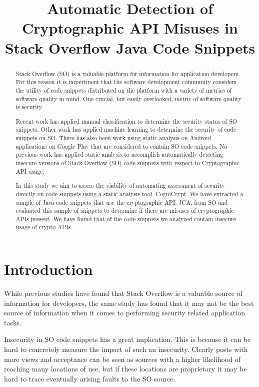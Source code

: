 \documentclass[10pt, conference]{IEEEtran}
\begin{document}
\title{Automatic Detection of Cryptographic API Misuses in Stack Overflow Java Code Snippets\\}

\author{
}

\maketitle

\begin{abstract}
Stack Overflow (SO) is a valuable platform for information for application developers. For this reason it is impertinent that the software development community considers the utility of code snippets distributed on the platform with a variety of metrics of software quality in mind. One crucial, but easily overlooked, metric of software quality is security. 

Recent work has applied manual classification to determine the security status of SO snippets. Other  work has applied machine learning to determine the security of code snippets on SO. There has also been work using static analysis on Android applications on Google Play that are considered to contain SO code snippets. No previous work has applied static analysis to accomplish automatically detecting insecure versions of Stack Overflow (SO) code snippets with respect to Cryptographic API usage.

In this study we aim to assess the viability of automating assessment of security directly on code snippets using a static analysis tool, CogniCrypt. We have extracted a sample of Java code snippets that use the cryptographic API, JCA, from SO and evaluated this sample of snippets to determine if there are misuses of cryptographic APIs present. We have found that of the code snippets we analyzed contain insecure usage of crypto APIs. 
\end{abstract}

\section{Introduction}
While previous studies have found that Stack Overflow is a valuable source of information for developers, the same study has found that it may not be the best source of information when it comes to performing security related application tasks.

Insecurity in SO code snippets has a great implication. This is because it can be hard to concretely measure the impact of such an insecurity. 
Clearly posts with more views and acceptance can be seen as sources with a higher likelihood of reaching many locations of use, but if  these locations are proprietary it may be hard to trace eventually arising faults to the SO source.
\end{document}
